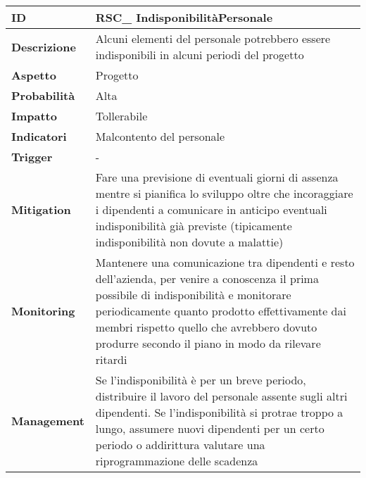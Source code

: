 \clearpage
\begin{tabular}{|p{2.2cm}|p{9.6cm}| }
 	\hline
	\textbf{ID} & RSC\_ IndisponibilitàPersonale\\ [0.5ex] 
	\hline
	\textbf{Descrizione} & Alcuni elementi del personale potrebbero essere indisponibili in alcuni periodi del progetto\\ 
	\hline
	\textbf{Aspetto} &  Progetto \\
	\hline
	\textbf{Probabilità} &  Alta \\ 
	\hline
	\textbf{Impatto} &  Tollerabile \\ 
	\hline
	\textbf{Indicatori} & Malcontento del personale\\
	\hline
	\textbf{Trigger} & -\\
	\hline
	\textbf{Mitigation} & Fare una previsione di eventuali giorni di assenza mentre si pianifica lo sviluppo oltre che incoraggiare i dipendenti a comunicare in anticipo eventuali indisponibilità già previste (tipicamente indisponibilità non dovute a malattie) \\ 
	\hline
	\textbf{Monitoring} & Mantenere una comunicazione tra dipendenti e resto dell'azienda, per venire a conoscenza il prima possibile di indisponibilità e monitorare periodicamente quanto prodotto effettivamente dai membri rispetto quello che avrebbero dovuto produrre secondo il piano in modo da rilevare ritardi\\ 
	\hline
	\textbf{Management} & Se l'indisponibilità è per un breve periodo, distribuire il lavoro del personale assente sugli altri dipendenti. Se l'indisponibilità si protrae troppo a lungo, assumere nuovi dipendenti per un certo periodo o addirittura valutare una riprogrammazione delle scadenza\\ 
	\hline
\end{tabular}


